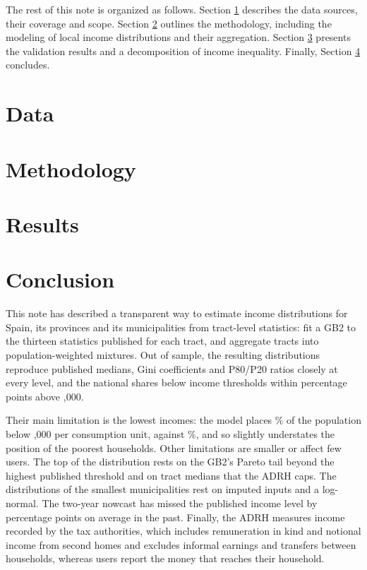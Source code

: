 \documentclass[letterpaper,11pt,leqno]{article}
\begin{document}
The rest of this note is organized as follows. Section \ref{sec:data} describes the data sources, their coverage and scope. Section \ref{sec:method} outlines the methodology, including the modeling of local income distributions and their aggregation. Section \ref{sec:results} presents the validation results and a decomposition of income inequality. Finally, Section \ref{sec:conc} concludes.

\section{Data}\label{sec:data}



\section{Methodology}\label{sec:method}



\section{Results}\label{sec:results}



\section{Conclusion}\label{sec:conc}

This note has described a transparent way to estimate income distributions for Spain, its provinces and its municipalities from tract-level statistics: fit a GB2 to the thirteen statistics published for each tract, and aggregate tracts into population-weighted mixtures. Out of sample, the resulting distributions reproduce published medians, Gini coefficients and P80/P20 ratios closely at every level, and the national shares below income thresholds within \ThrOtherMaxDiff{} percentage points above ,000.

Their main limitation is the lowest incomes: the model places \ThrFiveKModel{}\% of the population below ,000 per consumption unit, against \ThrFiveKObs{}\%, and so slightly understates the position of the poorest households. Other limitations are smaller or affect few users. The top of the distribution rests on the GB2's Pareto tail beyond the highest published threshold and on tract medians that the ADRH caps. The distributions of the smallest municipalities rest on imputed inputs and a log-normal. The two-year nowcast has missed the published income level by \NowcastBtMAE{} percentage points on average in the past. Finally, the ADRH measures income recorded by the tax authorities, which includes remuneration in kind and notional income from second homes and excludes informal earnings and transfers between households, whereas users report the money that reaches their household.
\end{document}
